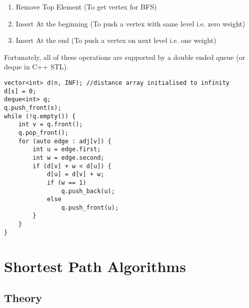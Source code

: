 \documentclass[twoside,12pt,a4paper,english]{book}
\theoremstyle{definition}
\theoremstyle{problemstyle}
\begin{document}
\begin{enumerate}
    \item Remove Top Element (To get vertex for BFS)
    \item Insert At the beginning (To push a vertex with same level i.e. zero weight)
    \item Insert At the end (To push a vertex on next level i.e. one weight)
\end{enumerate}
Fortunately, all of these operations are supported by a double ended queue (or deque in C++ STL).
\newpage
\begin{lstlisting}
vector<int> d(n, INF); //distance array initialised to infinity
d[s] = 0;
deque<int> q;
q.push_front(s);
while (!q.empty()) {
    int v = q.front();
    q.pop_front();
    for (auto edge : adj[v]) {
        int u = edge.first;
        int w = edge.second;
        if (d[v] + w < d[u]) {
            d[u] = d[v] + w;
            if (w == 1)
                q.push_back(u);
            else
                q.push_front(u);
        }
    }
}
\end{lstlisting}

\part{Shortest Path Algorithms}

\chapter{Theory}
\end{document}
